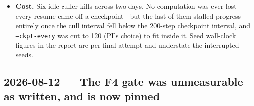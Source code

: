 \documentclass[11pt,a4paper]{article}
\newcommand{\code}[1]{\texttt{\small #1}}
\begin{document}
\begin{itemize}
$\tau_{\max}$ after training is 1{,}050.7 $\pm$ 21.0 tokens, against an
empirical 46{,}319. The runbook asked for \code{tau\_stats()}; had the gate been
read from it, the answer would have been off by a factor of 44, because once
trained, $\Delta$ is dominated by the input-dependent term
$W_\Delta\delta'_t$ rather than by the bias.
\item \textbf{Cost.} Six idle-culler kills across two days. No computation was
ever lost---every resume came off a checkpoint---but the last of them stalled
progress entirely once the cull interval fell below the 200-step checkpoint
interval, and \code{--ckpt-every} was cut to 120 (PI's choice) to fit inside it.
Seed wall-clock figures in the report are per final attempt and understate the
interrupted seeds.
\end{itemize}

\subsection*{2026-08-12 --- The F4 gate was unmeasurable as written, and is now
pinned}
\end{document}
